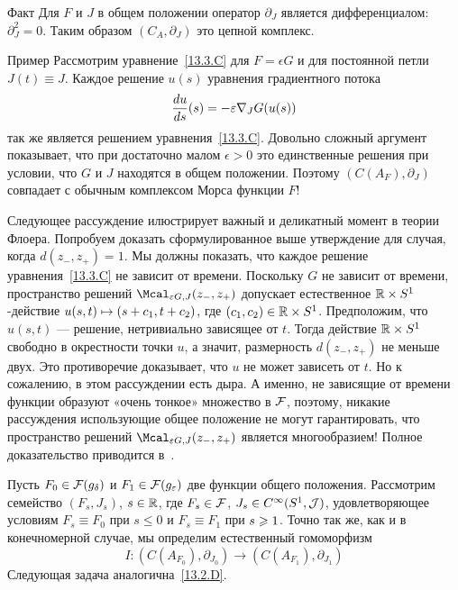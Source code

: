\begin{thm}{Факт}\label{13.3.F}
  Для $F$ и $J$ в общем положении оператор $\partial_{J}$ является
  дифференциалом: $\partial_{J}^{2}=0$.
  Таким образом $(C_{A},\partial_{J})$ это цепной комплекс.
\end{thm}

\begin{thm}{Пример}\label{13.3.G}
  Рассмотрим уравнение~\ref{13.3.C} для $F = \epsilon G$ и для
  постоянной петли $J(t)\equiv J$.
  Каждое решение $u(s)$ уравнения градиентного потока
  \[
  \frac{d u}{d s} (s) = -\varepsilon\nabla_{J} G(u(s))
  \]
  так же является решением уравнения~\ref{13.3.C}.
  Довольно сложный аргумент \cite[Lemma 7.1]{HS} показывает, что при
  достаточно малом $\epsilon>0$ это единственные решения при
  условии, что $G$ и $J$ находятся в общем положении.
  Поэтому $(C(A_{F}),\partial_{J})$ совпадает с обычным комплексом
  Морса функции $F$!
\end{thm}

Следующее рассуждение илюстрирует важный и деликатный
момент в теории Флоера.
Попробуем доказать сформулированное выше утверждение для случая, когда
$d(z_{-}, z_{+})=1$.  
Мы должны показать, что каждое решение уравнения~\ref{13.3.C} не
зависит от времени.
Поскольку $G$ не зависит от времени, пространство решений
$\Mcal_{\epsilon G,J}(z_{-},z_{+})$ допускает естественное $\mathbb{R}\times
S^{1}$-действие $u(s, t) \mapsto (s\z+c_{1},t+c_{2})$, где
$(c_{1},c_{2})\in\mathbb{R}\times S^{1}$.
Предположим, что $u(s, t)$ --- решение, нетривиально зависящее от $t$.
Тогда действие $\mathbb{R}\times S^{1}$ свободно в окрестности точки $u$,
а значит, размерность $d(z_{-}, z_{+})$ не меньше двух.
Это противоречие доказывает, что $u$ не может зависеть от $t$.
Но к сожалению, в этом рассуждении есть дыра.
А именно, не зависящие от времени функции образуют «очень тонкое»
множество в $\mathcal{F}$, поэтому, никакие рассуждения использующие общее
положение не могут гарантировать, что пространство решений
$\Mcal_{\epsilon G,J}(z_{-}, z_{+})$ является многообразием!
Полное доказательство приводится в~\cite{HS}.

Пусть $F_{0}\in\mathcal{F}(g_{\delta})$ и $F_{1}\in\mathcal{F}(g_{\varepsilon})$ две
функции общего положения. 
Рассмотрим семейство $(F_{s}, J_{s})$, $s\in\mathbb{R}$, где
$F_{s}\in\mathcal{F}$, $J_{s}\in C^{\infty}(S^{1},\mathcal{J})$, удовлетворяющее
условиям 
$F_{s}\equiv F_{0}$ при $s\le0$ и $F_{s}\equiv F_{1}$ при $s\z\ge1$.
Точно так же, как и в конечномерной случае, мы определим
естественный гомоморфизм
\[
I:(C(A_{F_{0}}),\partial_{J_{0}})\to(C(A_{F_{1}}),\partial_{J_{1}})
\]
Следующая задача аналогична~\ref{13.2.D}.

